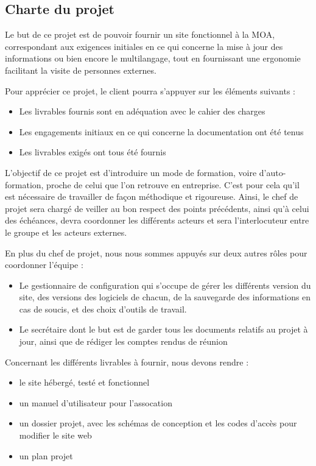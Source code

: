 \documentclass[11pt]{report}
\begin{document}
\subsection{Charte du projet}
Le but de ce projet est de pouvoir fournir un site fonctionnel à la MOA, 
correspondant aux exigences initiales en ce qui concerne la mise à jour des 
informations ou bien encore le multilangage, tout en fournissant une 
ergonomie facilitant la visite de personnes externes.\\

\par Pour apprécier ce projet, le client pourra s'appuyer sur les éléments 
suivants : 
\begin{itemize}
    \item Les livrables fournis sont en adéquation avec le cahier des charges
    \item Les engagements initiaux en ce qui concerne la documentation ont été 
tenus
    \item Les livrables exigés ont tous été fournis\\
\end{itemize}

\par L'objectif de ce projet est d'introduire un mode de formation, voire 
d'auto-formation, proche de celui que l'on retrouve en entreprise. C'est pour 
cela qu'il est nécessaire de travailler de façon méthodique et rigoureuse. 
Ainsi, le chef de projet sera chargé de veiller au bon respect des points 
précédents, ainsi qu'à celui des échéances, devra coordonner les différents 
acteurs et sera l'interlocuteur entre le groupe et les acteurs externes.\\

\par En plus du chef de projet, nous nous sommes appuyés sur deux autres rôles 
pour coordonner l'équipe : 
\begin{itemize}
    \item Le gestionnaire de configuration qui s'occupe de gérer les différents 
version du site, des versions des logiciels de chacun, de la sauvegarde des 
informations en cas de soucis, et des choix d'outils de travail.
    \item Le secrétaire dont le but est de garder tous les documents relatifs 
au projet à jour, ainsi que de rédiger les comptes rendus de réunion\\
\end{itemize}

\par Concernant les différents livrables à fournir, nous devons rendre : 
	\begin{itemize}
	  \item le site hébergé, testé et fonctionnel
	  \item un manuel d'utilisateur pour l'assocation
	  \item un dossier projet, avec les schémas de conception et les codes d'accès pour modifier le site web
	  \item un plan projet
	\end{itemize}
\end{document}
